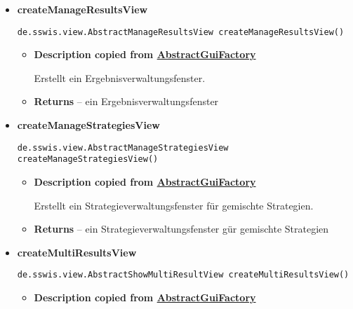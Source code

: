 {{{{{{{{{{\begin{itemize}
{\begin{itemize}
{Erstellt ein Initialisierungsverwaltungsfenster.
}
\item{{\bf  Returns} -- 
ein Initialisierungsverwaltungsfenster 
}%
\end{itemize}
}%
\item{ 
\hypertarget{de.sswis.controller.SwingGuiFactory.createManageResultsView()}{{\bf  createManageResultsView}\\}
\begin{lstlisting}[frame=none]
de.sswis.view.AbstractManageResultsView createManageResultsView()\end{lstlisting} %
\begin{itemize}
\item{
{\bf  Description copied from \hyperlink{de.sswis.controller.AbstractGuiFactory}{AbstractGuiFactory}{\small {}} }

Erstellt ein Ergebnisverwaltungsfenster.
}
\item{{\bf  Returns} -- 
ein Ergebnisverwaltungsfenster 
}%
\end{itemize}
}%
\item{ 
\hypertarget{de.sswis.controller.SwingGuiFactory.createManageStrategiesView()}{{\bf  createManageStrategiesView}\\}
\begin{lstlisting}[frame=none]
de.sswis.view.AbstractManageStrategiesView createManageStrategiesView()\end{lstlisting} %
\begin{itemize}
\item{
{\bf  Description copied from \hyperlink{de.sswis.controller.AbstractGuiFactory}{AbstractGuiFactory}{\small {}} }

Erstellt ein Strategieverwaltungsfenster für gemischte Strategien.
}
\item{{\bf  Returns} -- 
ein Strategieverwaltungsfenster gür gemischte Strategien 
}%
\end{itemize}
}%
\item{ 
\hypertarget{de.sswis.controller.SwingGuiFactory.createMultiResultsView()}{{\bf  createMultiResultsView}\\}
\begin{lstlisting}[frame=none]
de.sswis.view.AbstractShowMultiResultView createMultiResultsView()\end{lstlisting} %
\begin{itemize}
\item{
{\bf  Description copied from \hyperlink{de.sswis.controller.AbstractGuiFactory}{AbstractGuiFactory}{\small {}} }

}
\end{itemize}}
\end{itemize}}}}}}}}}}}
